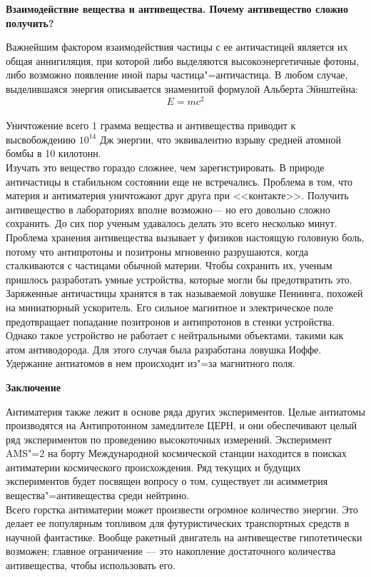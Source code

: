 \begin{flushleft}
\newpage
\textbf{Взаимодействие вещества и антивещества. Почему антивещество сложно получить?}
\vspace*{14pt}

Важнейшим фактором взаимодействия частицы с ее античастицей является их общая аннигиляция, 
при которой либо выделяются высокоэнергетичные фотоны, либо возможно появление иной пары 
частица"=античастица. В любом случае, выделившаяся энергия описывается знаменитой формулой Альберта Эйнштейна:
\begin{equation*}
    E = mc^2
\end{equation*} \\
Уничтожение всего 1 грамма вещества и антивещества приводит к высвобождению $10^{14}$ Дж энергии, что 
 эквивалентно взрыву средней атомной бомбы в 10 килотонн. \\

Изучать это вещество гораздо сложнее, 
чем зарегистрировать. В природе античастицы в стабильном состоянии еще не
встречались. Проблема в том, что материя и антиматерия
уничтожают друг друга при <<контакте>>.
Получить антивещество в лабораториях вполне возможно— но его довольно сложно сохранить. 
До сих пор ученым удавалось делать это всего несколько минут.\\

Проблема хранения антивещества вызывает у физиков настоящую головную боль, потому что антипротоны
и позитроны мгновенно разрушаются, когда сталкиваются с частицами обычной материи.
Чтобы сохранить их, ученым пришлось разработать умные устройства, которые могли бы предотвратить
это. Заряженные античастицы хранятся в так называемой ловушке Пеннинга,
похожей на миниатюрный ускоритель. Его сильное магнитное и электрическое поле предотвращает
попадание позитронов и антипротонов в стенки устройства. Однако такое устройство не работает с
нейтральными объектами, такими как атом антиводорода. Для этого случая была разработана ловушка Иоффе.
Удержание антиатомов в нем происходит из"=за магнитного поля.


\newpage
\textbf{Заключение}
\vspace*{14pt}

Антиматерия также лежит в основе ряда других экспериментов. Целые антиатомы производятся 
на Антипротонном замедлителе ЦЕРН, и они обеспечивают целый ряд экспериментов по проведению 
высокоточных измерений. Эксперимент AMS"=2 на борту Международной космической станции находится 
в поисках антиматерии космического происхождения. Ряд текущих и будущих экспериментов будет 
посвящен вопросу о том, существует ли асимметрия вещества"=антивещества среди нейтрино. \\
Всего горстка антиматерии может произвести огромное количество энергии. Это делает ее популярным 
топливом для футуристических транспортных средств в научной фантастике. Вообще ракетный двигатель 
на антивеществе гипотетически возможен; главное ограничение — это накопление достаточного количества 
антивещества, чтобы использовать его.\\


\end{flushleft}
